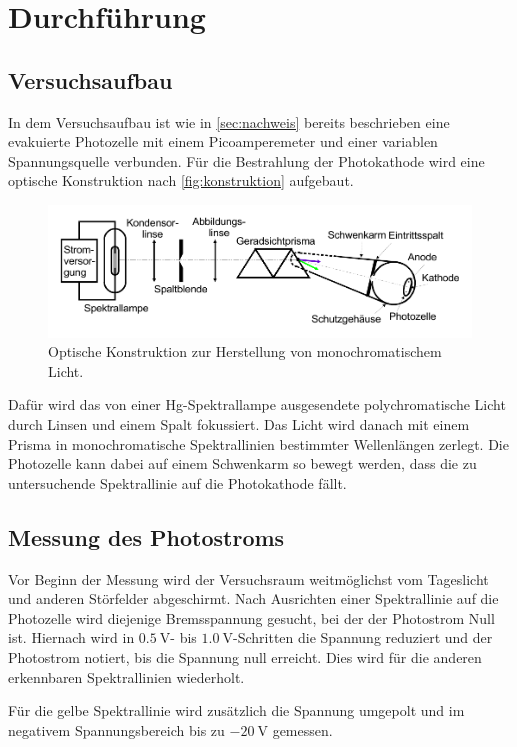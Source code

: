\section{Durchführung}
\label{sec:Durchführung}

\subsection{Versuchsaufbau}

In dem Versuchsaufbau ist wie in \autoref{sec:nachweis} bereits beschrieben eine evakuierte Photozelle
mit einem Picoamperemeter und einer variablen Spannungsquelle verbunden.
Für die Bestrahlung der Photokathode wird eine optische Konstruktion nach \autoref{fig:konstruktion} aufgebaut.
\begin{figure}
    \centering
    \includegraphics[width=\textwidth]{bilder/anordnung.pdf}
    \caption{Optische Konstruktion zur Herstellung von monochromatischem Licht. \cite{v500}}
    \label{fig:konstruktion}
\end{figure}

Dafür wird das von einer Hg-Spektrallampe ausgesendete polychromatische Licht durch Linsen und einem Spalt fokussiert.
Das Licht wird danach mit einem Prisma in monochromatische Spektrallinien bestimmter Wellenlängen zerlegt.
Die Photozelle kann dabei auf einem Schwenkarm so bewegt werden, 
dass die zu untersuchende Spektrallinie auf die Photokathode fällt.


\subsection{Messung des Photostroms}

Vor Beginn der Messung wird der Versuchsraum weitmöglichst vom Tageslicht und anderen Störfelder abgeschirmt.
Nach Ausrichten einer Spektrallinie auf die Photozelle wird diejenige Bremsspannung gesucht, 
bei der der Photostrom Null ist. 
Hiernach wird in $\qty{0.5}{\volt}$- bis $\qty{1.0}{\volt}$-Schritten die Spannung reduziert und der Photostrom notiert,
bis die Spannung null erreicht. Dies wird für die anderen erkennbaren Spektrallinien wiederholt.

Für die gelbe Spektrallinie wird zusätzlich die Spannung umgepolt 
und im negativem Spannungsbereich bis zu $\qty{-20}{\volt}$ gemessen.